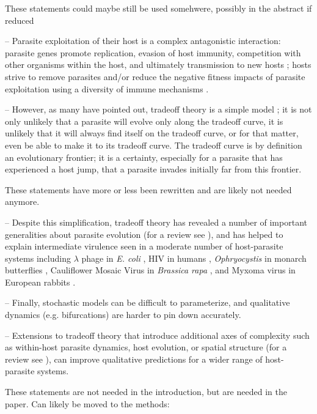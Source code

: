 These statements could maybe still be used somehwere, possibly in the abstract if reduced

-- Parasite exploitation of their host is a complex antagonistic interaction: parasite genes promote replication, evasion of host immunity, competition with other organisms within the host, and ultimately transmission to new hosts \cite{Bushetal.2001}; hosts strive to remove parasites and/or reduce the negative fitness impacts of parasite exploitation using a diversity of immune mechanisms \citep{Soaresetal.2017}.

-- However, as many have pointed out, tradeoff theory is a simple model \citep{BullandLauring2014, AlizonandMichalakis2015, Cressleretal.2016}; it is not only unlikely that a parasite will evolve only along the tradeoff curve, it is unlikely that it will always find itself on the tradeoff curve, or for that matter, even be able to make it to its tradeoff curve. The tradeoff curve is by definition an evolutionary frontier; it is a certainty, especially for a parasite that has experienced a host jump, that a parasite invades initially far from this frontier.


These statements have more or less been rewritten and are likely not needed anymore.

-- Despite this simplification, tradeoff theory has revealed a number of important generalities about parasite evolution (for a review see \citealt{Cressleretal.2016}), and has helped to explain intermediate virulence seen in a moderate number of host-parasite systems including $\lambda$ phage in \emph{E. coli} \citep{Berngruberetal.2015}, HIV in humans \citep{Fraseretal.2007}, \emph{Ophryocystis} in monarch butterflies \citep{DeRoodeetal.2008}, Cauliflower Mosaic Virus in \emph{Brassica rapa} \citep{Doumayrouetal.2013}, and Myxoma virus in European rabbits \citep{AndersonandMay1982}.

-- Finally, stochastic models can be difficult to parameterize, and qualitative dynamics (e.g. bifurcations) are harder to pin down accurately.

-- Extensions to tradeoff theory that introduce additional axes of complexity such as within-host parasite dynamics, host evolution, or spatial structure (for a review see \citealt{Cressleretal.2016}), can improve qualitative predictions for a wider range of host-parasite systems. 


These statements are not needed in the introduction, but are needed in the paper. Can likely be moved to the methods:

